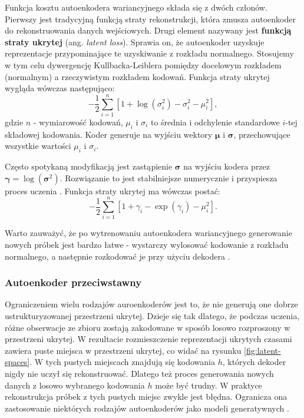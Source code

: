 \documentclass[12pt]{mwbk}
\theoremstyle{plain}
\theoremstyle{definition}
\theoremstyle{remark}
\begin{document}
Funkcja kosztu autoenkodera wariancyjnego składa się z dwóch członów. Pierwszy jest tradycyjną funkcją straty rekonstrukcji, która zmusza autoenkoder do rekonstruowania danych wejściowych. Drugi element nazywany jest \textbf{funkcją straty ukrytej} (ang. \emph{latent loss}). Sprawia on, że autoenkoder uzyskuje reprezentacje przypominające te uzyskiwanie z rozkładu normalnego. Stosujemy w tym celu dywergencję Kullbacka-Leiblera pomiędzy docelowym rozkładem (normalnym) a rzeczywistym rozkładem kodowań. Funkcja straty ukrytej wygląda wówczas następująco:
$$-\frac{1}{2}\sum_{i=1}^{n}[1+\log(\sigma_i^2)-\sigma_i^2-\mu_i^2],$$
gdzie $n$ - wymiarowość kodowań, $\mu_i$ i $\sigma_i$ to średnia i odchylenie standardowe $i$-tej składowej kodowania. Koder generuje na wyjściu wektory $\mathbf{\mu}$ i $\mathbf{\sigma}$, przechowujące wszystkie wartości $\mu_i$ i $\sigma_i$.

Często spotykaną modyfikacją jest zastąpienie $\mathbf{\sigma}$ na wyjściu kodera przez $\mathbf{\gamma}=\log(\mathbf{\sigma}^2)$. Rozwiązanie to jest stabilniejsze numerycznie i przyspiesza proces uczenia \cite{geron}. Funkcja straty ukrytej ma wówczas postać:
$$-\frac{1}{2}\sum_{i=1}^{n}[1+\gamma_i-\exp(\gamma_i)-\mu_i^2].$$

Warto zauważyć, że po wytrenowaniu autoenkodera wariancyjnego generowanie nowych próbek jest bardzo łatwe - wystarczy wylosować kodowanie z rozkładu normalnego, a następnie rozkodować je przy użyciu dekodera \cite{geron}.

\subsubsection{Autoenkoder przeciwstawny}



Ograniczeniem wielu rodzajów auroenkoderów jest to, że nie generują one dobrze ustrukturyzowanej przestrzeni ukrytej. Dzieje się tak dlatego, że podczas uczenia, różne obserwacje ze zbioru zostają zakodowane w sposób losowo rozproszony w przestrzeni ukrytej. W rezultacie rozmieszczenie reprezentacji ukrytych czasami zawiera puste miejsca w przestrzeni ukrytej, co widać na rysunku \ref{fig:latent-spaces}. W tych pustych miejscach znajdują się kodowania $h$, których dekoder nigdy nie uczył się rekonstruować. Dlatego też proces generowania nowych danych z losowo wybranego kodowania $h$ może być trudny. W praktyce rekonstrukcja próbek z tych pustych miejsc zwykle jest błędna. Ogranicza ona zastosowanie niektórych rodzajów autoenkoderów jako modeli generatywnych \cite{pinaya}.
\end{document}

